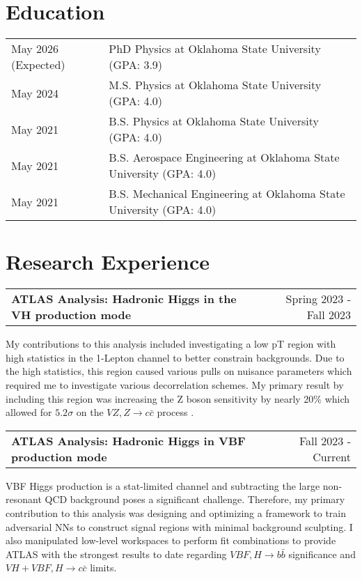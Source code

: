 \documentclass[a4paper,12pt]{article}
\makeatletter
\newenvironment{jobshort}[2]
    {
    \begin{tabularx}{\linewidth}{@{}l X r@{}}
    \textbf{#1} & \hfill &  #2 \\[3.75pt]
    \end{tabularx}
    }
    {
    }
\makeatother
\begin{document}
\section{Education}
\begin{tabularx}{\linewidth}{@{}l X@{}}	
May 2026 (Expected) & PhD Physics at Oklahoma State University \hfill \normalsize (GPA: 3.9) \\

May 2024 & M.S. Physics at Oklahoma State University \hfill (GPA: 4.0) \\ 

May 2021 & B.S. Physics at Oklahoma State University \hfill (GPA: 4.0) \\ 

May 2021 & B.S. Aerospace Engineering at Oklahoma State University \hfill (GPA: 4.0) \\ 

May 2021 & B.S. Mechanical Engineering at Oklahoma State University \hfill (GPA: 4.0) \\ 

\end{tabularx}

\section{Research Experience}

\begin{jobshort}{ATLAS Analysis: Hadronic Higgs in the VH production mode}{Spring 2023 - Fall 2023}
My contributions to this analysis included investigating a low pT region with high statistics in the 1-Lepton channel to better constrain backgrounds.
Due to the high statistics, this region caused various pulls on nuisance parameters which required me to investigate various decorrelation schemes.
My primary result by including this region was increasing the Z boson sensitivity by nearly 20\% which allowed for $5.2\sigma$ on the $VZ, Z\rightarrow c\bar{c}$ process \cite{VH}.
\end{jobshort}

\begin{jobshort}{ATLAS Analysis: Hadronic Higgs in VBF production mode}{Fall 2023 - Current}
VBF Higgs production is a stat-limited channel and subtracting the large non-resonant QCD background poses a significant challenge.
Therefore, my primary contribution to this analysis was designing and optimizing a framework to train adversarial NNs to construct signal regions with minimal background sculpting.
I also manipulated low-level workspaces to perform fit combinations to provide ATLAS with the strongest results to date regarding $VBF,H \rightarrow b\bar{b}$ significance and $VH+VBF,H \rightarrow c\bar{c}$ limits.
\end{jobshort}
\end{document}
